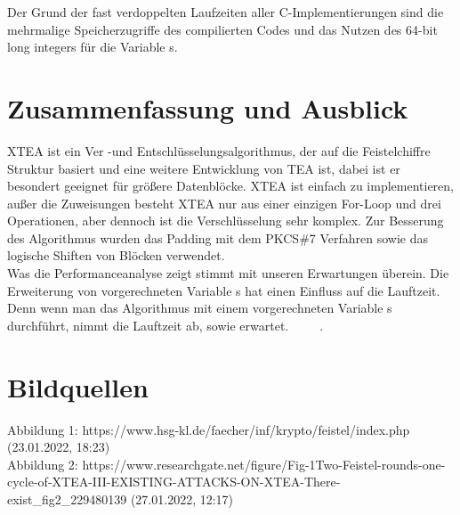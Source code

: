 \documentclass[course=asp]{aspdoc}
\begin{document}
Der Grund der fast verdoppelten Laufzeiten aller C-Implementierungen sind die mehrmalige Speicherzugriffe des compilierten
Codes und das Nutzen des 64-bit long integers für die Variable s.

\section{Zusammenfassung und Ausblick}
XTEA ist ein Ver -und Entschlüsselungsalgorithmus, der auf die Feistelchiffre Struktur basiert und eine weitere Entwicklung von TEA ist, dabei ist er besondert geeignet für größere Datenblöcke. XTEA ist einfach zu implementieren, außer die Zuweisungen besteht XTEA nur aus einer einzigen For-Loop und drei Operationen, aber dennoch ist die Verschlüsselung sehr komplex. Zur Besserung des Algorithmus wurden das Padding mit dem PKCS\#7 Verfahren sowie das logische Shiften von Blöcken verwendet.  \\
Was die Performanceanalyse zeigt stimmt mit unseren Erwartungen überein. Die Erweiterung von vorgerechneten Variable s hat einen Einfluss auf die Lauftzeit. Denn wenn man das Algorithmus mit einem vorgerechneten Variable s durchführt, nimmt die Lauftzeit ab, sowie erwartet.
~\cite{whatispkcs7} ~\cite{al2017programmable} ~\cite{appel2016sicherheitsaspekte}.


\newpage
\section{Bildquellen}
Abbildung 1: https://www.hsg-kl.de/faecher/inf/krypto/feistel/index.php (23.01.2022, 18:23) \\
Abbildung 2: https://www.researchgate.net/figure/Fig-1Two-Feistel-rounds-one-cycle-of-XTEA-III-EXISTING-ATTACKS-ON-XTEA-There-exist\_fig2\_229480139 (27.01.2022, 12:17)\\


{}
\end{document}

